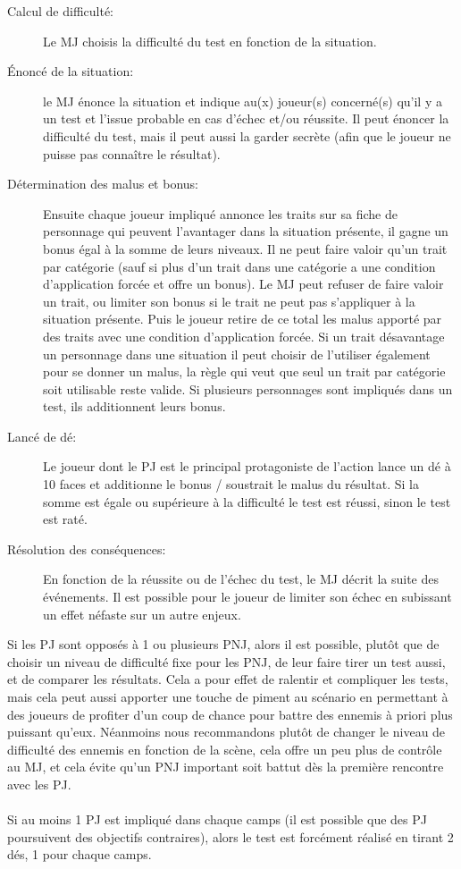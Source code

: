 \documentclass[a4paper,10pt,twoside,twocolumn]{article}
\begin{document}
 \begin{description}
  \item[Calcul de difficulté:] Le MJ choisis la difficulté du test en fonction de la situation.
  \item[Énoncé de la situation:] le MJ énonce la situation et indique au(x) joueur(s) concerné(s) qu'il y a un test et l'issue probable en cas d'échec et/ou réussite. Il peut énoncer la difficulté du test, mais il peut aussi la garder secrète (afin que le joueur ne puisse pas connaître le résultat).
  \item[Détermination des malus et bonus:] Ensuite chaque joueur impliqué annonce les traits sur sa fiche de personnage qui peuvent l'avantager dans la situation présente, il gagne un bonus égal à la somme de leurs niveaux. Il ne peut faire valoir qu'un trait par catégorie (sauf si plus d'un trait dans une catégorie a une condition d'application forcée et offre un bonus). Le MJ peut refuser de faire valoir un trait, ou limiter son bonus si le trait ne peut pas s'appliquer à la situation présente. Puis le joueur retire de ce total les malus apporté par des traits avec une condition d'application forcée. Si un trait désavantage un personnage dans une situation il peut choisir de l'utiliser également pour se donner un malus, la règle qui veut que seul un trait par catégorie soit utilisable reste valide. Si plusieurs personnages sont impliqués dans un test, ils additionnent leurs bonus.
  \item[Lancé de dé:] Le joueur dont le PJ est le principal protagoniste de l'action lance un dé à 10 faces et additionne le bonus / soustrait le malus du résultat. Si la somme est égale ou supérieure à la difficulté le test est réussi, sinon le test est raté.
  \item[Résolution des conséquences:] En fonction de la réussite ou de l'échec du test, le MJ décrit la suite des événements. Il est possible pour le joueur de limiter son échec en subissant un effet néfaste sur un autre enjeux.
 \end{description}
 
 Si les PJ sont opposés à 1 ou plusieurs PNJ, alors il est possible, plutôt que de choisir un niveau de difficulté fixe pour les PNJ, de leur faire tirer un test aussi, et de comparer les résultats. Cela a pour effet de ralentir et compliquer les tests, mais cela peut aussi apporter une touche de piment au scénario en permettant à des joueurs de profiter d'un coup de chance pour battre des ennemis à priori plus puissant qu'eux. Néanmoins nous recommandons plutôt de changer le niveau de difficulté des ennemis en fonction de la scène, cela offre un peu plus de contrôle au MJ, et cela évite qu'un PNJ important soit battut dès la première rencontre avec les PJ.\\
 \\
 Si au moins 1 PJ est impliqué dans chaque camps (il est possible que des PJ poursuivent des objectifs contraires), alors le test est forcément réalisé en tirant 2 dés, 1 pour chaque camps.
\end{document}
